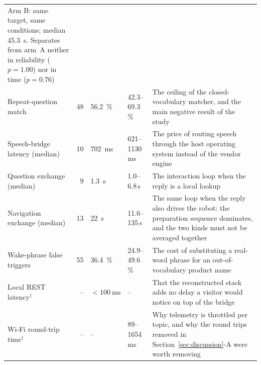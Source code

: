 \begin{table}[!t]
\begin{tabular}{@{}p{3.2cm}rp{1.7cm}p{1.9cm}p{8.4cm}@{}}
Arm B: same target, same conditions; median \SI{45.3}{\second}. Separates from arm~A neither in
reliability ($p=1.00$) nor in time ($p=0.76$) \\
Repeat-question match            & 48 & \SI{56.2}{\percent}& \numrange{42.3}{69.3}\,\% &
The ceiling of the closed-vocabulary matcher, and the main negative result of the study \\
Speech-bridge latency (median)   & 10 & \SI{702}{\milli\second} & \numrange{621}{1130}\,ms &
The price of routing speech through the host operating system instead of the vendor engine \\
Question exchange (median)       & 9  & \SI{1.3}{\second}  & \numrange{1.0}{6.8}\,s &
The interaction loop when the reply is a local lookup \\
Navigation exchange (median)     & 13 & \SI{22}{\second}   & \numrange{11.6}{135}\,s &
The same loop when the reply also drives the robot: the preparation sequence dominates, and the
two kinds must not be averaged together \\
Wake-phrase false triggers       & 55 & \SI{36.4}{\percent}& \numrange{24.9}{49.6}\,\% &
The cost of substituting a real-word phrase for an out-of-vocabulary product name \\
Local REST latency$^{\dagger}$   & -- & $<\SI{100}{\milli\second}$ & -- &
That the reconstructed stack adds no delay a visitor would notice on top of the bridge \\
Wi-Fi round-trip time$^{\dagger}$ & -- & --                & \numrange{89}{1654}\,ms &
Why telemetry is throttled per topic, and why the round trips removed in
Section~\ref{sec:discussion}-A were worth removing \\
\bottomrule
\end{tabular}
\end{table}
